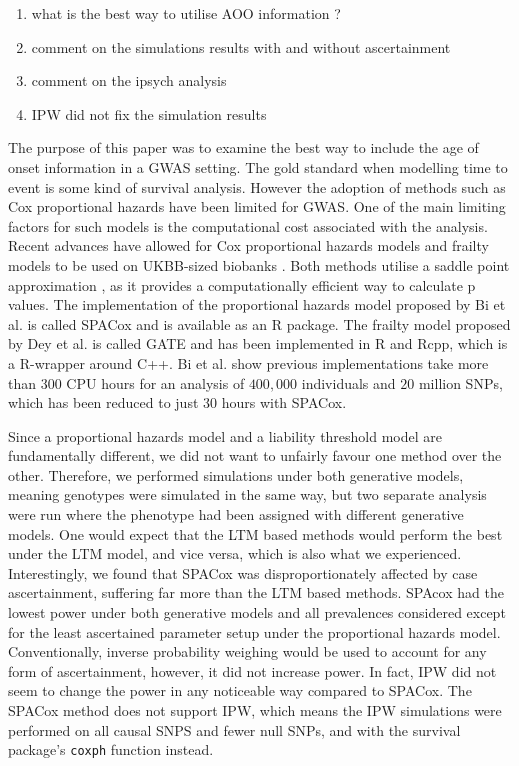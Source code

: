 \begin{enumerate}
	\item what is the best way to utilise AOO information ?
	\item comment on the simulations results with and without ascertainment
	\item comment on the ipsych analysis
	\item IPW did not fix the simulation results
\end{enumerate}


The purpose of this paper was to examine the best way to include the age of onset information in a GWAS setting. The gold standard when modelling time to event is some kind of survival analysis. However the adoption of methods such as Cox proportional hazards have been limited for GWAS. One of the main limiting factors for such models is the computational cost associated with the analysis. Recent advances have allowed for Cox proportional hazards models and frailty models to be used on UKBB-sized biobanks \cite{bi2020fast,dey2022efficient}. Both methods utilise a saddle point approximation \cite{daniels1954saddlepoint}, as it provides a computationally efficient way to calculate p values. The implementation of the proportional hazards model proposed by Bi et al. is called SPACox and is available as an R package. The frailty model proposed by Dey et al. is called GATE and has been implemented in R and Rcpp, which is a R-wrapper around C++. Bi et al. show previous implementations take more than $ 300 $ CPU hours for an analysis of $ 400,000 $ individuals and $ 20 $ million SNPs, which has been reduced to just $ 30 $ hours with SPACox.

Since a proportional hazards model and a liability threshold model are fundamentally different, we did not want to unfairly favour one method over the other. Therefore, we performed simulations under both generative models, meaning genotypes were simulated in the same way, but two separate analysis were run where the phenotype had been assigned with different generative models. One would expect that the LTM based methods would perform the best under the LTM model, and vice versa, which is also what we experienced. Interestingly, we found that SPACox was disproportionately affected by case ascertainment, suffering far more than the LTM based methods. SPAcox had the lowest power under both generative models and all prevalences considered except for the least ascertained parameter setup under the proportional hazards model. Conventionally, inverse probability weighing would be used to account for any form of ascertainment, however, it did not increase power. In fact, IPW did not seem to change the power in any noticeable way compared to SPACox. The SPACox method does not support IPW, which means the IPW simulations were performed on all causal SNPS and fewer null SNPs, and with the survival\cite{Therneau2020-xf} package's \texttt{coxph} function instead.


